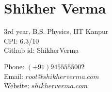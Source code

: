 \documentclass[a4paper]{article}
\author{Shikher Verma}
\begin{document}
\section*{\huge\textbf Shikher Verma}
\begin{minipage}{.45\linewidth}
	\begin{flushleft}
		3rd year, B.S. Physics, IIT Kanpur\\
		CPI: 6.3/10\\
		Github id: ShikherVerma
	\end{flushleft}
\end{minipage}
\hfill
\begin{minipage}{.45\linewidth}
	\begin{flushright}
		Phone: $(+91)9455555002$\\
		Email: $root@shikherverma.com$\\
		Website: $shikherverma.com$\\
	\end{flushright}
\end{minipage}

\end{document}
